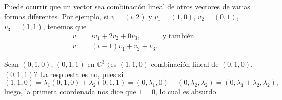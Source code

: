 \documentclass[handout]{beamer} %
\newcommand{\C}{\mathbb C}
\begin{document}
\begin{frame}

    \begin{ejemplo}
		Puede ocurrir que un vector sea combinación lineal de otros vectores de varias formas diferentes. Por ejemplo,   si   $v = (i,2)$ y $v_1 = (1,0)$, $v_2 = (0,1)$, $v_3 = (1,1)$,  tenemos que
			\begin{align*}
				v &= iv_1+2v_2+0v_3,\quad\quad\quad\text{y también}\\
				v &= (i-1)v_1 + v_2 + v_3.  
			\end{align*}
    \end{ejemplo}
    \pause
    \begin{ejemplo}
			Sean $(0,1,0)$, $(0,1,1)$ en $\C^3$ ¿es $(1,1,0)$ combinación lineal de $(0,1,0)$, $(0,1,1)$? La respuesta es no, pues si 
			$$
			(1,1,0) = \lambda_1(0,1,0)+ \lambda_2(0,1,1) = (0,\lambda_1,0)+ (0,\lambda_2,\lambda_2) = (0,\lambda_1+\lambda_2,\lambda_2),
			$$ 
			luego, la primera coordenada nos dice que $1=0$, lo cual es absurdo. 
			
	\end{ejemplo}
		
	    
\end{frame}
        
\end{document}
